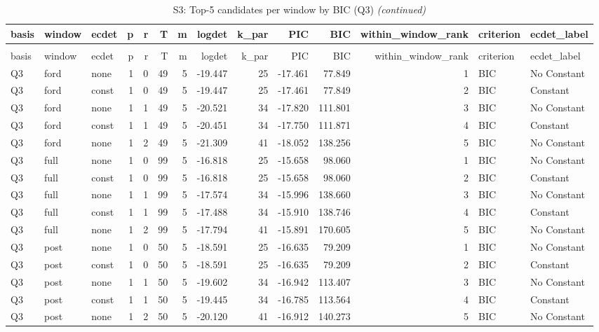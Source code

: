 \begingroup\fontsize{9}{11}\selectfont

\begin{longtable}[t]{lllrrrrrrrrrll}
\caption{\label{tab:tab:S3_bic_top5_Q3}S3: Top-5 candidates per window by BIC (Q3)}\\
\toprule
basis & window & ecdet & p & r & T & m & logdet & k\_par & PIC & BIC & within\_window\_rank & criterion & ecdet\_label\\
\midrule
\endfirsthead
\caption[]{S3: Top-5 candidates per window by BIC (Q3) \textit{(continued)}}\\
\toprule
basis & window & ecdet & p & r & T & m & logdet & k\_par & PIC & BIC & within\_window\_rank & criterion & ecdet\_label\\
\midrule
\endhead

\endfoot
\bottomrule
\endlastfoot
Q3 & ford & none & 1 & 0 & 49 & 5 & -19.447 & 25 & -17.461 & 77.849 & 1 & BIC & No Constant\\
Q3 & ford & const & 1 & 0 & 49 & 5 & -19.447 & 25 & -17.461 & 77.849 & 2 & BIC & Constant\\
Q3 & ford & none & 1 & 1 & 49 & 5 & -20.521 & 34 & -17.820 & 111.801 & 3 & BIC & No Constant\\
Q3 & ford & const & 1 & 1 & 49 & 5 & -20.451 & 34 & -17.750 & 111.871 & 4 & BIC & Constant\\
Q3 & ford & none & 1 & 2 & 49 & 5 & -21.309 & 41 & -18.052 & 138.256 & 5 & BIC & No Constant\\
\addlinespace
Q3 & full & none & 1 & 0 & 99 & 5 & -16.818 & 25 & -15.658 & 98.060 & 1 & BIC & No Constant\\
Q3 & full & const & 1 & 0 & 99 & 5 & -16.818 & 25 & -15.658 & 98.060 & 2 & BIC & Constant\\
Q3 & full & none & 1 & 1 & 99 & 5 & -17.574 & 34 & -15.996 & 138.660 & 3 & BIC & No Constant\\
Q3 & full & const & 1 & 1 & 99 & 5 & -17.488 & 34 & -15.910 & 138.746 & 4 & BIC & Constant\\
Q3 & full & none & 1 & 2 & 99 & 5 & -17.794 & 41 & -15.891 & 170.605 & 5 & BIC & No Constant\\
\addlinespace
Q3 & post & none & 1 & 0 & 50 & 5 & -18.591 & 25 & -16.635 & 79.209 & 1 & BIC & No Constant\\
Q3 & post & const & 1 & 0 & 50 & 5 & -18.591 & 25 & -16.635 & 79.209 & 2 & BIC & Constant\\
Q3 & post & none & 1 & 1 & 50 & 5 & -19.602 & 34 & -16.942 & 113.407 & 3 & BIC & No Constant\\
Q3 & post & const & 1 & 1 & 50 & 5 & -19.445 & 34 & -16.785 & 113.564 & 4 & BIC & Constant\\
Q3 & post & none & 1 & 2 & 50 & 5 & -20.120 & 41 & -16.912 & 140.273 & 5 & BIC & No Constant\\*
\end{longtable}
\endgroup{}
